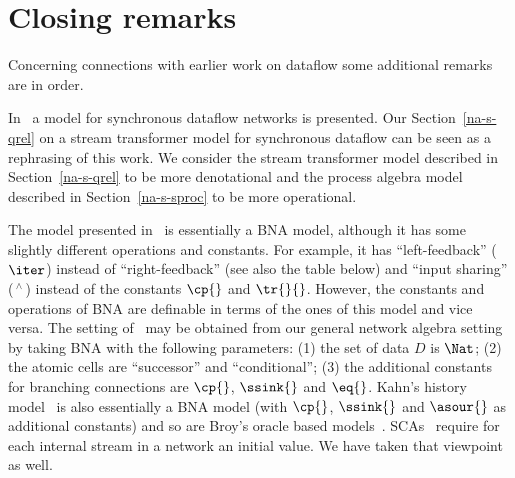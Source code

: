\documentclass[fleqn]{llncs}
\begin{document}
\section{Closing remarks}
\label{conclusions}
Concerning connections with earlier work on dataflow some additional
remarks are in order.

In~\cite{BWM94} a model for synchronous dataflow networks is presented.
Our Section~\ref{na-s-qrel} on a stream transformer model for
synchronous dataflow can be seen as a rephrasing of this work.
We consider the stream transformer model described in
Section~\ref{na-s-qrel} to be more denotational and the process algebra
model described in Section~\ref{na-s-sproc} to be more operational.

The model presented in~\cite{BWM94} is essentially a BNA model, although
it has some slightly different operations and constants.
For example, it has ``left-feedback'' ($\iter$) instead of
``right-feedback'' (see also the table below) and ``input sharing''
($\,^{\wedge}\,$) instead of the constants $\cp{}$ and $\tr{}{}$.
However, the constants and operations of BNA are definable in terms of
the ones of this model and vice versa.
The setting of~\cite{BWM94} may be obtained from our general network
algebra setting by taking BNA with the following parameters:
(1) the set of data $D$ is $\Nat$;
(2) the atomic cells are ``successor'' and ``conditional'';
(3) the additional constants for branching connections are
    $\cp{}$, $\ssink{}$ and $\eq{}$.
Kahn's history model~\cite{Kah74} is also essentially a BNA model (with
$\cp{}$, $\ssink{}$ and $\asour{}$ as additional constants) and so are
Broy's oracle based models~\cite{Bro88}.
SCAs~\cite{TT91} require for each internal stream in a network an
initial value.
We have taken that viewpoint as well.
\end{document}
